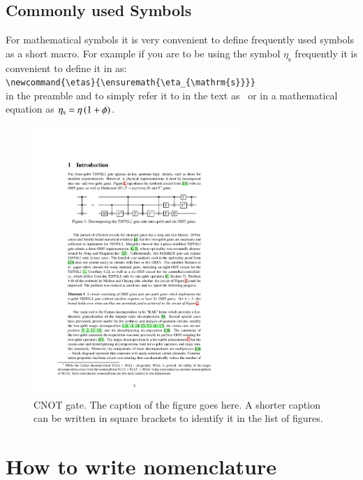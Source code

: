 \subsection{Commonly used Symbols}
For mathematical symbols it is very convenient to define frequently
used symbols as a short macro. For example if you are to be using the
symbol $\eta_{\mathrm{s}}$ frequently it is convenient to define it in
as:\\
\verb|\newcommand{\etas}{\ensuremath{\eta_{\mathrm{s}}}}| \\
in the preamble and to simply refer it to in the text as \etas\ or in
a mathematical equation as $\etas = \eta \, ( 1 + \phi)$.
%
\begin{figure}[tbp]
  \centering
    \includegraphics[width=0.7\textwidth]{CNOTdecompose}
    \caption[Process flow sheet]{CNOT gate. The caption of the figure goes here. A
      shorter caption can be written in square brackets to identify it
      in the list of figures.}
    \label{fig:cnot} 
\end{figure}
\section{How to write nomenclature} 

